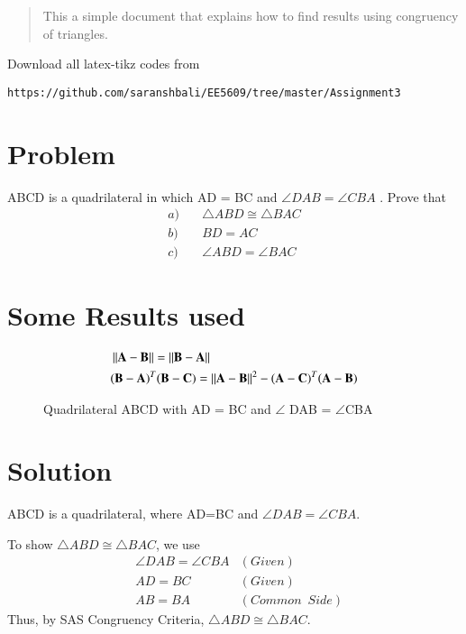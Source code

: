 \documentclass[journal,12pt,twocolumn]{IEEEtran}
\begin{document}
%
\begin{abstract}
This a simple document that explains how to find results using congruency of triangles.
\end{abstract}
%
%
Download all latex-tikz codes from 
%
\begin{lstlisting}
https://github.com/saranshbali/EE5609/tree/master/Assignment3
\end{lstlisting}
%
\section{Problem}
ABCD is a quadrilateral in which AD = BC and $\angle{DAB}  = \angle{CBA}$ . Prove that
\begin{align}
a) & \quad	\triangle ABD \cong \triangle BAC \\
b) & \quad BD = AC \\ 
c) & \quad \angle ABD = \angle BAC
\end{align}
\section{Some Results used}
\begin{align}
 & \left\lVert\mathbf{A}-\mathbf{B}\right\rVert  =    \left\lVert\mathbf{B}-\mathbf{A}\right\rVert \\
 & (\mathbf{B}-\mathbf{A})^T(\mathbf{B}-\mathbf{C})  =  \left\lVert\mathbf{A}-\mathbf{B}\right\rVert^2 - (\mathbf{A}-\mathbf{C})^T(\mathbf{A}-\mathbf{B}) 
\end{align}
\begin{figure}[!htb]
	\centering
	\centering
	\resizebox{\columnwidth}{!}{}
	\caption{Quadrilateral ABCD with AD = BC and $\angle$ DAB = $\angle$CBA}
\end{figure}
\section{Solution}
ABCD is a quadrilateral, where AD=BC and $\angle DAB= \angle CBA$.

To show $\triangle ABD \cong \triangle BAC$, we use
\begin{align}
	& \angle DAB = \angle CBA & (Given) \\
	& AD = BC & (Given) \\
	& AB = BA & (Common \enspace Side)
\end{align}
Thus, by SAS Congruency Criteria, $\triangle ABD \cong \triangle BAC$.
\end{document}
